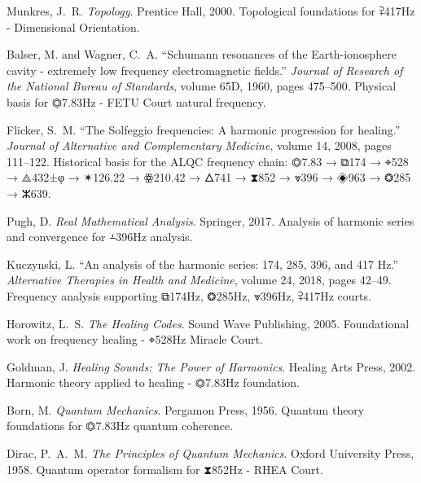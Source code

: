 Munkres, J.~R.
\textit{Topology}.
Prentice Hall, 2000.
Topological foundations for ⫀417Hz - Dimensional Orientation.


Balser, M. and Wagner, C.~A.
``Schumann resonances of the Earth-ionosphere cavity - extremely low frequency electromagnetic fields.''
\textit{Journal of Research of the National Bureau of Standards}, volume 65D, 1960, pages 475--500.
Physical basis for ⏣7.83Hz - FETU Court natural frequency.

Flicker, S.~M.
``The Solfeggio frequencies: A harmonic progression for healing.''
\textit{Journal of Alternative and Complementary Medicine}, volume 14, 2008, pages 111--122.
Historical basis for the ALQC frequency chain:
⏣7.83 → ⧉174 → ⌖528 → ⟁432±φ → ✴126.22 → ꙮ210.42 → 🜂741 → ⧗852 → ⩔396 → ◈963 → ❂285 → ⵣ639.

Pugh, D.
\textit{Real Mathematical Analysis}.
Springer, 2017.
Analysis of harmonic series and convergence for ⨩396Hz analysis.

Kuczynski, L.
``An analysis of the harmonic series: 174, 285, 396, and 417 Hz.''
\textit{Alternative Therapies in Health and Medicine}, volume 24, 2018, pages 42--49.
Frequency analysis supporting ⧉174Hz, ❂285Hz, ⩔396Hz, ⫀417Hz courts.

Horowitz, L.~S.
\textit{The Healing Codes}.
Sound Wave Publishing, 2005.
Foundational work on frequency healing - ⌖528Hz Miracle Court.

Goldman, J.
\textit{Healing Sounds: The Power of Harmonics}.
Healing Arts Press, 2002.
Harmonic theory applied to healing - ⏣7.83Hz foundation.


Born, M.
\textit{Quantum Mechanics}.
Pergamon Press, 1956.
Quantum theory foundations for ⏣7.83Hz quantum coherence.

Dirac, P.~A.~M.
\textit{The Principles of Quantum Mechanics}.
Oxford University Press, 1958.
Quantum operator formalism for ⧗852Hz - RHEA Court.

